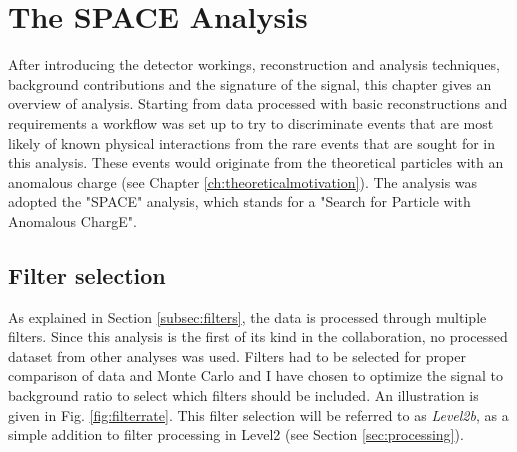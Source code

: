 \chapter{The SPACE Analysis}
After introducing the detector workings, reconstruction and analysis techniques, background contributions and the signature of the signal, this chapter gives an overview of analysis. Starting from data processed with basic reconstructions and requirements a workflow was set up to try to discriminate events that are most likely of known physical interactions from the rare events that are sought for in this analysis. These events would originate from the theoretical particles with an anomalous charge (see Chapter \ref{ch:theoreticalmotivation}). The analysis was adopted the "SPACE" analysis, which stands for a "Search for Particle with Anomalous ChargE".

\section{Filter selection}
As explained in Section \ref{subsec:filters}, the data is processed through multiple filters. Since this analysis is the first of its kind in the collaboration, no processed dataset from other analyses was used. Filters had to be selected for proper comparison of data and Monte Carlo and I have chosen to optimize the signal to background ratio to select which filters should be included. An illustration is given in Fig. \ref{fig:filterrate}. This filter selection will be referred to as \textit{Level2b}, as a simple addition to filter processing in Level2 (see Section \ref{sec:processing}). 

